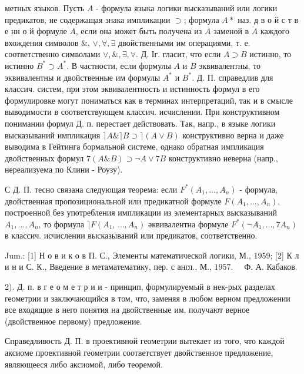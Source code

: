 \documentclass[10pt]{article}
\begin{document}
метных языков. Пусть $A$ - формула языка логики высказываний или логики предикатов, не содержащая знака импликации $\supset$; формула $A *$ наз. д в о й с т в е нн о й формуле $A$, если она может быть получена из $A$ заменой в $\dot{A}$ каждого вхождения символов \&, $\vee, \forall, \exists$ двойственными им операциями, т. е. соответственно символами $\vee, \&, \exists, \forall$. Д. Іг. гласит, что если $A \supset B$ истинно, то истинно $B^{*} \supset A^{*}$. В частности, если формулы $A$ и $B$ эквивалентны, то эквивалентны и двойственные им формулы $A^{*}$ и $B^{*}$. Д. П. справедлив для классич. систем, при этом эквивалентность и истинность формул в его формулировке могут пониматься как в терминах интерпретаций, так и в смысле выводимости в соответствующем классич. исчислении. При конструктивном понимании формул Д. п. перестает действовать. Так, напр., в языке логики высказываний импликация $\rceil A \&\rceil B \supset\rceil(A \vee B)$ конструктивно верна и даже выводима в Гейтинга бормальной системе, однако обратная импликация двойственных формул $7(A \& B) \supset \neg A \vee 7 B$ конструктивно неверна (напр., нереализуема по Клини - Роузу).



С Д. П. тесно связана следующая теорема: если $F^{*}\left(A_{1}, \ldots, A_{n}\right)$ - формула, двойственная пропозициональной или предикатной формуле $F\left(A_{1}, \ldots, A_{n}\right)$, построенной без употребления импликации из элементарных высказываний $A_{1}, \ldots, A_{n}$, то формула $\rceil F\left(A_{1}\right.$, $\left.\ldots, A_{n}\right)$ әквивалентна формуле $F^{*}\left(\neg A_{1}, \ldots, 7 A_{n}\right)$ в классич. исчислении высказываний или предикатов, соответственно.



Jum.: [1] Н о в и к о в П. С., Элементы математической логики, М., 1959; [2] К л и н и С. К., Введение в метаматематику, пер. с англ., М., $1957 . \quad$ Ф. А. Кабаков.



2). Д. п. в г е о м е т р и и - принцип, формулируемый в нек-рых разделах геометрии и заключающийся в том, что, заменяя в любом верном предложении все входящие в него понятия на двойственные им, получают верное (двойственное первому) предложение.



Справедливость Д. П. в проективной геометрии вытекает из того, что каждой аксиоме проективной геометрии соответствует двойственное предложение, являющееся либо аксиомой, либо теоремой.
\end{document}
